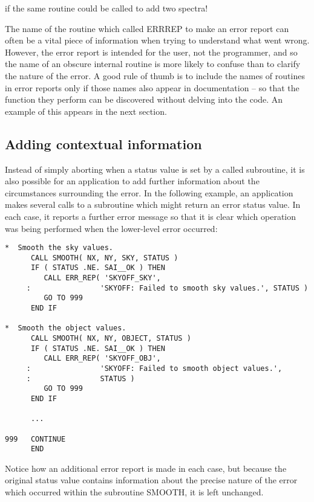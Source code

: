 \documentclass[twoside,11pt]{article}
\newcommand{\xlabel}[1]{}
\renewcommand{\_}{\texttt{\symbol{95}}}
\begin{document}
if the same routine could be called to add two spectra!

The name of the routine which called ERR\_REP to make an error report can
often be a vital piece of information when trying to understand what went
wrong. 
However, the error report is intended for the user, not the programmer, and so
the name of an obscure internal routine is more likely to confuse than to
clarify the nature of the error.
A good rule of thumb is to include the names of routines in error reports
only if those names also appear in documentation -- so that the function
they perform can be discovered without delving into the code.
An example of this appears in the next section.


\subsection{\xlabel{adding_contextual_information}Adding contextual information}

Instead of simply aborting when a status value is set by a called
subroutine, it is also possible for an application to add further information
about the circumstances surrounding the error. 
In the following example, an application makes several calls to a subroutine
which might return an error status value. 
In each case, it reports a further error message so that it is clear which 
operation was being performed when the lower-level error occurred:

\begin {small}
\begin{verbatim}
*  Smooth the sky values.
      CALL SMOOTH( NX, NY, SKY, STATUS )
      IF ( STATUS .NE. SAI__OK ) THEN
         CALL ERR_REP( 'SKYOFF_SKY',
     :                'SKYOFF: Failed to smooth sky values.', STATUS )
         GO TO 999
      END IF

*  Smooth the object values.
      CALL SMOOTH( NX, NY, OBJECT, STATUS )
      IF ( STATUS .NE. SAI__OK ) THEN
         CALL ERR_REP( 'SKYOFF_OBJ',
     :                'SKYOFF: Failed to smooth object values.', 
     :                STATUS )
         GO TO 999
      END IF

      ...

999   CONTINUE
      END
\end{verbatim}
\end {small}

Notice how an additional error report is made in each case, but because
the original status value contains information about the precise nature of 
the error which occurred within the subroutine SMOOTH, it is left unchanged. 
\end{document}
